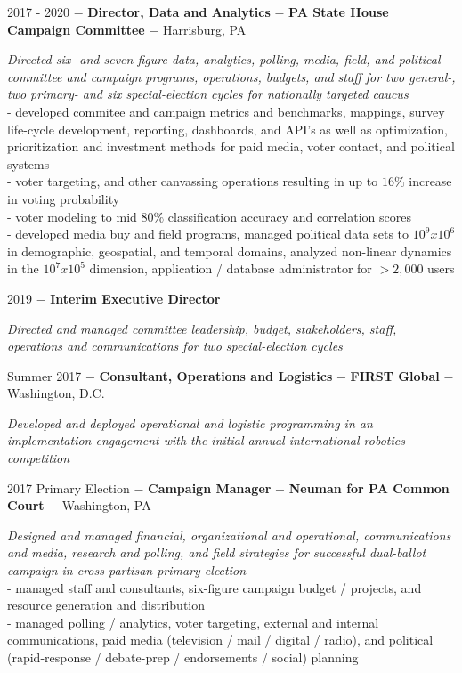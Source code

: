 \documentclass[8pt]{article}
\begin{document}
2017 - 2020 $-$ \textbf{Director, Data and Analytics} $-$ \textbf{PA State House Campaign Committee} $-$ Harrisburg, PA
\begin{adjustwidth}{1cm}{1cm}
	\textit{Directed six- and seven-figure data, analytics, polling, media, field, and political committee and campaign programs, operations, budgets, and staff for two general-, two primary- and six special-election cycles for nationally targeted caucus} \\
- developed commitee and campaign metrics and benchmarks, mappings, survey life-cycle development, reporting, dashboards, and API's as well as optimization, prioritization and investment methods for paid media, voter contact, and political systems\\
- voter targeting, and other canvassing operations resulting in up to $16\%$ increase in voting probability \\ 
- voter modeling to mid $80\%$ classification accuracy and correlation scores \\
- developed media buy and field programs, managed political data sets to $10^9 x 10^6$ in demographic, geospatial, and temporal domains, analyzed non-linear dynamics in the $ 10^7 x 10^5 $ dimension, application / database  administrator for $>2,000$ users 
\end{adjustwidth}
2019 $-$ \textbf{Interim Executive Director}
\begin{adjustwidth}{1cm}{1cm}
	\textit{Directed and managed committee leadership, budget, stakeholders, staff, operations and communications for two special-election cycles}\\
\end{adjustwidth}

Summer 2017 $-$ \textbf{Consultant, Operations and Logistics} $-$ \textbf{FIRST Global} $-$  Washington, D.C.
\begin{adjustwidth}{1cm}{1cm}
	\textit{Developed and deployed operational and logistic programming in an implementation engagement with the initial annual international robotics competition}\\
\end{adjustwidth}

2017 Primary Election $-$ \textbf{Campaign Manager} $-$ \textbf{Neuman for PA Common Court} $-$ Washington, PA
\begin{adjustwidth}{1cm}{1cm}
	\textit{Designed and managed financial, organizational and operational, communications and media, research and polling, and field strategies for successful dual-ballot campaign in cross-partisan primary election}\\
- managed staff and consultants, six-figure campaign budget / projects, and resource generation and distribution \\
- managed polling / analytics, voter targeting, external and internal communications, paid media (television / mail / digital / radio), and political (rapid-response / debate-prep / endorsements / social) planning \\
\end{adjustwidth}
\end{document}
